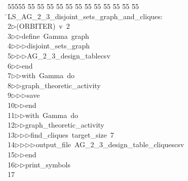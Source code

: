 %
%
\begin{tabbing}
55555 \= 55 \= 55 \= 55 \= 55 \= 55 \= 55 \= 55 \= 55 \= 55 \= 55 \= 55 \= 55 \= \>LS\_AG\_2\_3\_disjoint\_sets\_graph\_and\_cliques:\\[0pt]
2\>$\triangleright$\>(ORBITER)\ v\ 2\ \\[0pt]
3\>$\triangleright$\>$\triangleright$\>define\ Gamma\ graph\ \\[0pt]
4\>$\triangleright$\>$\triangleright$\>$\triangleright$\>disjoint\_sets\_graph\ \\[0pt]
5\>$\triangleright$\>$\triangleright$\>$\triangleright$\>AG\_2\_3\_design\_tablecsv\ \\[0pt]
6\>$\triangleright$\>$\triangleright$\>end\ \\[0pt]
7\>$\triangleright$\>$\triangleright$\>with\ Gamma\ do\ \\[0pt]
8\>$\triangleright$\>$\triangleright$\>graph\_theoretic\_activity\ \\[0pt]
9\>$\triangleright$\>$\triangleright$\>$\triangleright$\>save\ \\[0pt]
10\>$\triangleright$\>$\triangleright$\>end\ \\[0pt]
11\>$\triangleright$\>$\triangleright$\>with\ Gamma\ do\ \\[0pt]
12\>$\triangleright$\>$\triangleright$\>graph\_theoretic\_activity\ \\[0pt]
13\>$\triangleright$\>$\triangleright$\>$\triangleright$\>find\_cliques\ target\_size\ 7\ \\[0pt]
14\>$\triangleright$\>$\triangleright$\>$\triangleright$\>$\triangleright$\>output\_file\ AG\_2\_3\_design\_table\_cliquescsv\ \\[0pt]
15\>$\triangleright$\>$\triangleright$\>end\ \\[0pt]
16\>$\triangleright$\>$\triangleright$\>print\_symbols\\[0pt]
17\>\end{tabbing}
